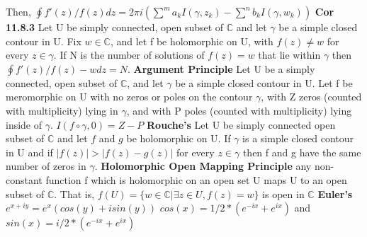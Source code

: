 \documentclass[8pt]{extarticle}
\theoremstyle{definition}
\begin{document}
Then, $\oint f'(z)/f(z) dz = 2\pi i (\sum^m a_k I(\gamma, z_k) - \sum^n b_k I(\gamma,w_k))$
\textbf{Cor 11.8.3} Let U be simply connected, open subset of $\mathbb{C}$ and let $\gamma$ be a simple closed contour in U. Fix $w \in \mathbb{C}$, and let f be holomorphic on U, with $f(z) \neq w$ for every $z \in \gamma$. If N is the number of solutions of $f(z) = w$ that lie within $\gamma$ then $\oint f'(z)/f(z) - w dz = N$.
\textbf{Argument Principle} Let U be a simply connected, open subset of $\mathbb{C}$, and let $\gamma$ be a simple closed contour in U. Let f be meromorphic on U with no zeros or poles on the contour $\gamma$, with Z zeros (counted with multiplicity) lying in $\gamma$,
and with P poles (counted with multiplicity) lying inside of $\gamma$. $I(f \circ \gamma, 0) = Z -P$
\textbf{Rouche's} Let U be simply connected open subset of $\mathbb{C}$ and let $f$ and $g$ be holomorphic on U. If $\gamma$ is a simple closed contour in U and if $|f(z)| > |f(z)-g(z)|$ for every $z \in \gamma$ then f and g have the same number of zeros in $\gamma$. 
\textbf{Holomorphic Open Mapping Principle} any non-constant function f which is holomorphic on an open set U maps U to an open subset of $\mathbb{C}$. That is, $f(U) = \{w\in \mathbb{C}|\exists z \in U, f(z) = w\}$ is open in $\mathbb{C}$
\textbf{Euler's} $e^{x+iy} = e^x (cos(y) + i sin(y))$
$cos(x) = 1/2 * (e^{-ix} + e^{ix})$ and $sin(x) = i/2 * (e^{-ix} + e^{ix})$
\end{document}
